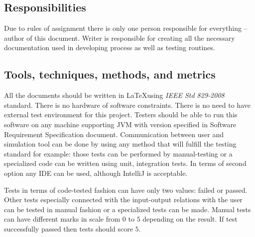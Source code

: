 \subsection{Responsibilities} \label{s:introduction:resposibilities}
	\begin{comment}
		$<$Provide an overview of the organizational content topic(s) and responsibilities for testing tasks. Identify organizational components and their primary (they are the task leader) and secondary (they are not the leader, but providing support) test-related responsibilities. $>$
	\end{comment}
	Due to rules of assignment there is only one person responsible for everything -- author of this document. Writer is responsible for creating all the necessary documentation used in developing process as well as testing routines.
\subsection{Tools, techniques, methods, and metrics} \label{s:introduction:tools-techniques-methods-and-metrics}
	\begin{comment}
		$<$Describe documents, hardware and software, test tools, techniques, methods, and test environment to be used in the test process. Describe the techniques that will be used to identify and capture reusable testware. Include information regarding acquisition, training, support, and qualification for each tool, technology, and method.\\
		Document the metrics to be used by the test effort, and describe how these metrics support the test objectives. Metrics appropriate to the Level Test Plans (e.g., component, component integration, system, and acceptance) may be included in those documents (see Annex E). $>$
	\end{comment}
	All the documents should be written in \LaTeX using \emph{IEEE Std 829-2008} standard. There is no hardware of software constraints. There is no need to have external test environment for this project. Testers should be able to run this software on any machine supporting JVM with version specified in Software Requirement Specification document. Communication between user and simulation tool can be done by using any method that will fulfill the testing standard for example: those tests can be performed by manual-testing or a specialized code can be written using unit, integration tests. In terms of second option any IDE can be used, although IntelliJ is acceptable.
	
	Tests in terms of code-tested fashion can have only two values: failed or passed. Other tests especially connected with the input-output relations with the user can be tested in manual fashion or a specialized tests can be made. Manual tests can have different marks in scale from $0$ to $5$ depending on the result. If test successfully passed then tests should score $5$.